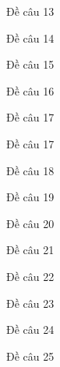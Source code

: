\begin{ex}
	Đề câu 13
	\choice
	{\True }
	{}
	{}
	{}	
\end{ex}


\begin{ex}
	Đề câu 14
	\choice
	{\True }
	{}
	{}
	{}	
\end{ex}


\begin{ex}
	Đề câu 15
	\choice
	{\True }
	{}
	{}
	{}	
\end{ex}


\begin{ex}
	Đề câu 16
	\choice
	{\True }
	{}
	{}
	{}	
\end{ex}


\begin{ex}
	Đề câu 17
	\choice
	{\True }
	{}
	{}
	{}	
\end{ex}


\begin{ex}
	Đề câu 17
	\choice
	{\True }
	{}
	{}
	{}	
\end{ex}


\begin{ex}
	Đề câu 18
	\choice
	{\True }
	{}
	{}
	{}	
\end{ex}


\begin{ex}
	Đề câu 19
	\choice
	{\True }
	{}
	{}
	{}	
\end{ex}


\begin{ex}
	Đề câu 20
	\choice
	{\True }
	{}
	{}
	{}	
\end{ex}


\begin{ex}
	Đề câu 21
	\choice
	{\True }
	{}
	{}
	{}	
\end{ex}


\begin{ex}
	Đề câu 22
	\choice
	{\True }
	{}
	{}
	{}	
\end{ex}


\begin{ex}
	Đề câu 23
	\choice
	{\True }
	{}
	{}
	{}	
\end{ex}


\begin{ex}
	Đề câu 24
	\choice
	{\True }
	{}
	{}
	{}	
\end{ex}


\begin{ex}
	Đề câu 25
	\choice
	{\True }
	{}
	{}
	{}	
\end{ex}


